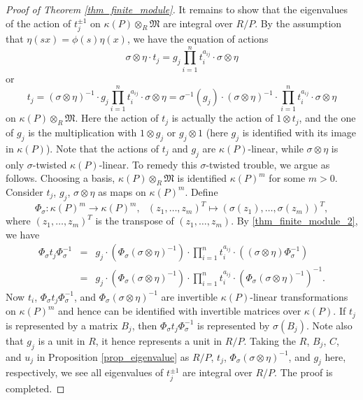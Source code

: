 \documentclass[12pt]{amsart}
\theoremstyle{plain}
\theoremstyle{definition}
\theoremstyle{question}
\theoremstyle{remark}
\theoremstyle{assumption}
\numberwithin{equation}{section}
\theoremstyle{bigthm}
\begin{document}
\begin{proof}[Proof of Theorem \ref{thm_finite_module}]
It remains to show that the eigenvalues of the action of $t_{j}^{\pm 1}$ on $\kappa (P) \otimes_{R} \mathfrak{M}$ are integral over $R/P$. By the assumption that $\eta (sx) = \phi (s) \eta (x)$, we have the equation of actions
\[
\sigma \otimes \eta \cdot t_{j} = g_{j} \prod_{i=1}^{n} t_{i}^{a_{ij}} \cdot \sigma \otimes \eta
\]
or
\begin{equation}\label{thm_finite_module_2}
t_{j} = (\sigma \otimes \eta)^{-1} \cdot g_{j} \prod_{i=1}^{n} t_{i}^{a_{ij}} \cdot \sigma \otimes \eta = \sigma^{-1} (g_{j}) \cdot (\sigma \otimes \eta)^{-1} \cdot \prod_{i=1}^{n} t_{i}^{a_{ij}} \cdot \sigma \otimes \eta
\end{equation}
on $\kappa (P) \otimes_{R} \mathfrak{M}$. Here the action of $t_{j}$ is actually the action of $1 \otimes t_{j}$, and the one of $g_{j}$ is the multiplication with $1 \otimes g_{j}$ or $g_{j} \otimes 1$ (here $g_{j}$ is identified with its image in $\kappa (P)$). Note that the actions of $t_{j}$ and $g_{j}$ are $\kappa (P)$-linear, while $\sigma \otimes \eta$ is only $\sigma$-twisted $\kappa (P)$-linear. To remedy this $\sigma$-twisted trouble, we argue as follows. Choosing a basis, $\kappa (P) \otimes_{R} \mathfrak{M}$ is identified $\kappa (P)^{m}$ for some $m > 0$. Consider $t_{j}$, $g_{j}$, $\sigma \otimes \eta$ as maps on $\kappa (P)^m$. Define
\[
\Phi_{\sigma}  \colon \kappa (P)^{m} \to \kappa(P)^m, \ \ \ (z_{1}, \dots, z_{m})^{T} \mapsto (\sigma (z_{1}), \dots, \sigma (z_{m}))^{T},
\]
where $(z_{1}, \dots, z_{m})^{T}$ is the transpose of $(z_{1}, \dots, z_{m})$. By \eqref{thm_finite_module_2}, we have
\begin{eqnarray*}
\Phi_{\sigma} t_{j} \Phi_{\sigma}^{-1} & = & g_{j} \cdot \left( \Phi_{\sigma} (\sigma \otimes \eta)^{-1} \right) \cdot \prod_{i=1}^{n} t_{i}^{a_{ij}} \cdot \left( (\sigma \otimes \eta) \Phi_{\sigma}^{-1} \right) \\
& = & g_{j} \cdot \left( \Phi_{\sigma} (\sigma \otimes \eta)^{-1} \right) \cdot \prod_{i=1}^{n} t_{i}^{a_{ij}} \cdot \left( \Phi_{\sigma} (\sigma \otimes \eta)^{-1} \right )^{-1}.
\end{eqnarray*}
Now $t_{i}$, $\Phi_{\sigma} t_{j} \Phi_{\sigma}^{-1}$, and $\Phi_{\sigma} (\sigma \otimes \eta)^{-1}$ are invertible $\kappa (P)$-linear transformations on $\kappa (P)^{m}$ and hence can be identified with invertible matrices over $\kappa (P)$. If $t_{j}$ is represented by a matrix $B_{j}$, then $\Phi_{\sigma} t_{j} \Phi_{\sigma}^{-1}$ is represented by $\sigma (B_{j})$. Note also that $g_{j}$ is a unit in $R$, it hence represents a unit in $R/P$. Taking the $R$, $B_{j}$, $C$, and $u_{j}$ in Proposition \ref{prop_eigenvalue} as $R/P$, $t_{j}$, $\Phi_{\sigma} (\sigma \otimes \eta)^{-1}$, and $g_{j}$ here, respectively, we see all eigenvalues of $t_{j}^{\pm 1}$ are integral over $R/P$. The proof is completed.
\end{proof}
\end{document}
